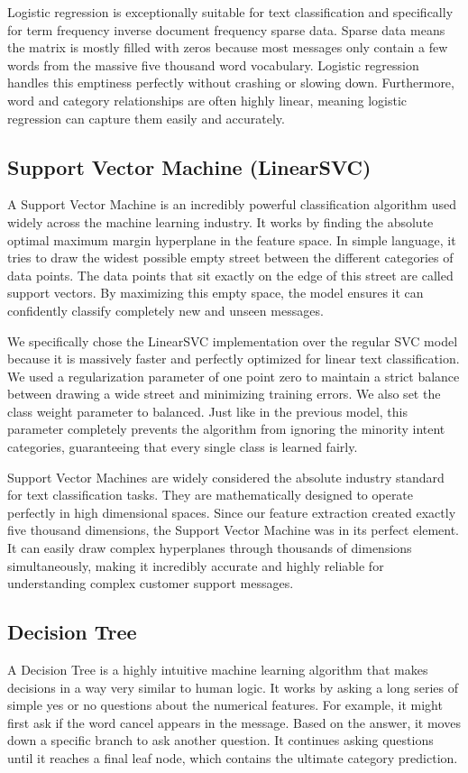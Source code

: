 \documentclass[12pt]{article}
\begin{document}
Logistic regression is exceptionally suitable for text classification and specifically for term frequency inverse document frequency sparse data. Sparse data means the matrix is mostly filled with zeros because most messages only contain a few words from the massive five thousand word vocabulary. Logistic regression handles this emptiness perfectly without crashing or slowing down. Furthermore, word and category relationships are often highly linear, meaning logistic regression can capture them easily and accurately.

\subsection{Support Vector Machine (LinearSVC)}
A Support Vector Machine is an incredibly powerful classification algorithm used widely across the machine learning industry. It works by finding the absolute optimal maximum margin hyperplane in the feature space. In simple language, it tries to draw the widest possible empty street between the different categories of data points. The data points that sit exactly on the edge of this street are called support vectors. By maximizing this empty space, the model ensures it can confidently classify completely new and unseen messages.

We specifically chose the LinearSVC implementation over the regular SVC model because it is massively faster and perfectly optimized for linear text classification. We used a regularization parameter of one point zero to maintain a strict balance between drawing a wide street and minimizing training errors. We also set the class weight parameter to balanced. Just like in the previous model, this parameter completely prevents the algorithm from ignoring the minority intent categories, guaranteeing that every single class is learned fairly.

Support Vector Machines are widely considered the absolute industry standard for text classification tasks. They are mathematically designed to operate perfectly in high dimensional spaces. Since our feature extraction created exactly five thousand dimensions, the Support Vector Machine was in its perfect element. It can easily draw complex hyperplanes through thousands of dimensions simultaneously, making it incredibly accurate and highly reliable for understanding complex customer support messages.

\subsection{Decision Tree}
A Decision Tree is a highly intuitive machine learning algorithm that makes decisions in a way very similar to human logic. It works by asking a long series of simple yes or no questions about the numerical features. For example, it might first ask if the word cancel appears in the message. Based on the answer, it moves down a specific branch to ask another question. It continues asking questions until it reaches a final leaf node, which contains the ultimate category prediction.
\end{document}
